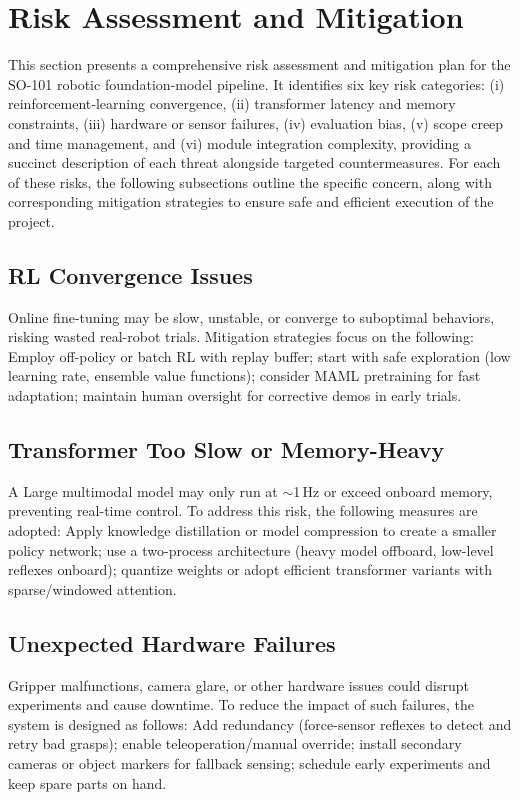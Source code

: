 \section{Risk Assessment and Mitigation}

This section presents a comprehensive risk assessment and mitigation plan for the SO-101 robotic foundation-model pipeline. It identifies six key risk categories: (i) reinforcement‐learning convergence, (ii) transformer latency and memory constraints, (iii) hardware or sensor failures, (iv) evaluation bias, (v) scope creep and time management, and (vi) module integration complexity, providing a succinct description of each threat alongside targeted countermeasures. For each of these risks, the following subsections outline the specific concern, along with corresponding mitigation strategies to ensure safe and efficient execution of the project.

\subsection{RL Convergence Issues}

Online fine-tuning may be slow, unstable, or converge to suboptimal behaviors, risking wasted real-robot trials. Mitigation strategies focus on the following: Employ off-policy or batch \ac{RL} with replay buffer; start with safe exploration (low learning rate, ensemble value functions); consider \ac{MAML} pretraining for fast adaptation; maintain human oversight for corrective demos in early trials.

\subsection{Transformer Too Slow or Memory-Heavy}
A Large multimodal model may only run at $\sim$1\,Hz or exceed onboard memory, preventing real-time control. To address this risk, the following measures are adopted: Apply knowledge distillation or model compression to create a smaller policy network; use a two-process architecture (heavy model offboard, low-level reflexes onboard); quantize weights or adopt efficient transformer variants with sparse/windowed attention.

\subsection{Unexpected Hardware Failures}
Gripper malfunctions, camera glare, or other hardware issues could disrupt experiments and cause downtime. To reduce the impact of such failures, the system is designed as follows: Add redundancy (force-sensor reflexes to detect and retry bad grasps); enable teleoperation/manual override; install secondary cameras or object markers for fallback sensing; schedule early experiments and keep spare parts on hand.

